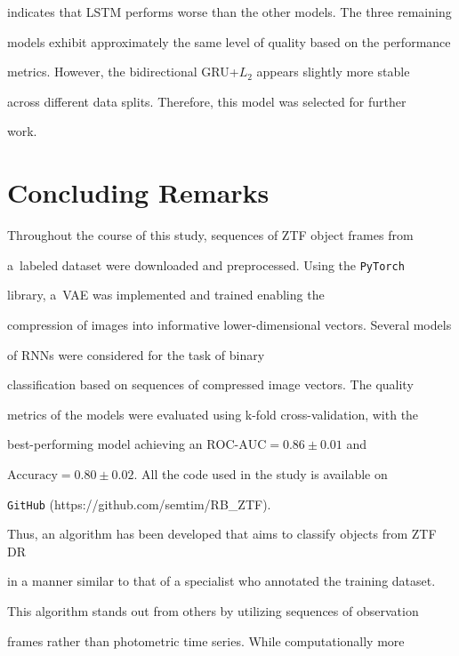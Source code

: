 indicates that LSTM performs worse than the other models. The three remaining 

models exhibit approximately the same level of quality based on the performance 

metrics. However, the bidirectional GRU\;+\;$L_2$ appears slightly more stable 

across different data splits. Therefore, this model was selected for further 

work.







\section{Concluding Remarks}



\noindent

Throughout the course of this study, sequences of ZTF object frames from 

a~labeled dataset were downloaded and preprocessed. Using the {\tt PyTorch} 

library, a~VAE was implemented and trained enabling the 

compression of images into informative lower-dimensional vectors. Several models 

of RNNs were considered for the task of binary 

classification based on sequences of compressed image vectors. The quality 

metrics of the models were evaluated using k-fold cross-validation, with the 

best-performing model achieving an $ \mathrm{ROC}\mbox{-}\mathrm{AUC}=0.86 \pm 0.01$ and 

$\mathrm{Accuracy}=0.80 \pm 0.02$. All the code used in the study is available on 

{\tt GitHub} ({\sf https://github.com/semtim/RB\_ZTF}).



Thus, an algorithm has been developed that aims to classify objects from ZTF DR 

in a manner similar to that of a specialist who annotated the training dataset. 

This algorithm stands out from others by utilizing sequences of observation 

frames rather than photometric time series. While computationally more 

